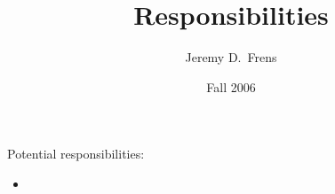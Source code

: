 \documentclass{article}
\title{Responsibilities}
\author{Jeremy D.\ Frens}
\date{Fall 2006}
\begin{document}
\thispagestyle{empty}

\maketitle

Potential responsibilities:
  \begin{itemize}
  \item
  \end{itemize}
\end{document}
